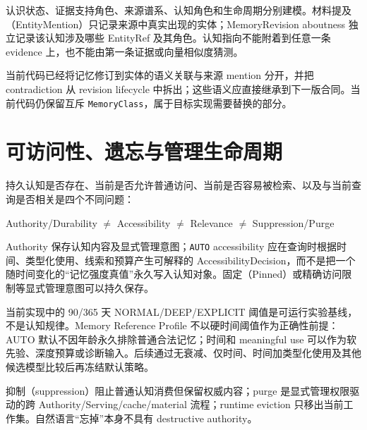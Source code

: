 认识状态、证据支持角色、来源谱系、认知角色和生命周期分别建模。材料提及（EntityMention）只记录来源中真实出现的实体；MemoryRevision aboutness 独立记录该认知涉及哪些 EntityRef 及其角色。认知指向不能附着到任意一条 evidence 上，也不能由第一条证据或向量相似度猜测。

当前代码已经将记忆修订到实体的语义关联与来源 mention 分开，并把 contradiction 从 revision lifecycle 中拆出；这些语义应直接继承到下一版合同。当前代码仍保留互斥 \texttt{MemoryClass}，属于目标实现需要替换的部分。\cite{nous-code-snapshot}

\section{可访问性、遗忘与管理生命周期}

持久认知是否存在、当前是否允许普通访问、当前是否容易被检索、以及与当前查询是否相关是四个不同问题：

\begin{center}
Authority/Durability $\neq$ Accessibility $\neq$ Relevance $\neq$ Suppression/Purge
\end{center}

Authority 保存认知内容及显式管理意图；\texttt{AUTO} accessibility 应在查询时根据时间、类型化使用、线索和预算产生可解释的 AccessibilityDecision，而不是把一个随时间变化的“记忆强度真值”永久写入认知对象。固定（Pinned）或精确访问限制等显式管理意图可以持久保存。

当前实现中的 90/365 天 NORMAL/DEEP/EXPLICIT 阈值是可运行实验基线，不是认知规律。Memory Reference Profile 不以硬时间阈值作为正确性前提：AUTO 默认不因年龄永久排除普通合法记忆；时间和 meaningful use 可以作为软先验、深度预算或诊断输入。后续通过无衰减、仅时间、时间加类型化使用及其他候选模型比较后再冻结默认策略。

抑制（suppression）阻止普通认知消费但保留权威内容；purge 是显式管理权限驱动的跨 Authority/Serving/cache/material 流程；runtime eviction 只移出当前工作集。自然语言“忘掉”本身不具有 destructive authority。